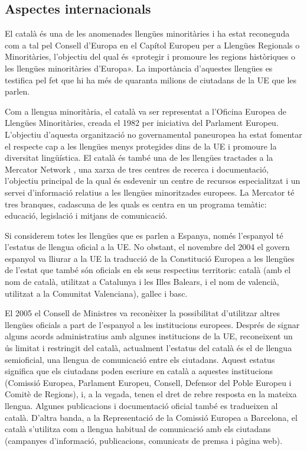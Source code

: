 \begin{multicols}{2}
\subsection{Aspectes internacionals}

El català és una de les anomenades llengües minoritàries i ha estat reconeguda com a tal pel Consell d’Europa en el Capítol Europeu per a Llengües Regionals o Minoritàries, l’objectiu del qual és «protegir i promoure les regions històriques o les llengües minoritàries d’Europa». La importància d’aquestes llengües es testifica pel fet que hi ha més de quaranta milions de ciutadans de la UE que les parlen.


Com a llengua minoritària, el català va ser representat a l’Oficina Europea de Llengües Minoritàries, creada el 1982 per iniciativa del Parlament Europeu. L’objectiu d’aquesta organització no governamental paneuropea ha estat fomentar el respecte cap a les llengües menys protegides dins de la UE i promoure la diversitat lingüística. El català és també una de les llengües tractades a la Mercator Network \cite{CAT-Nota8}, una xarxa de tres centres de recerca i documentació, l’objectiu principal de la qual és esdevenir un centre de recursos especialitzat i un servei d’informació relatius a les llengües minoritzades europees. La Mercator té tres branques, cadascuna de les quals es centra en un programa temàtic: educació, legislació i mitjans de comunicació.  

Si considerem totes les llengües que es parlen a Espanya, només l’espanyol té l’estatus de llengua oficial a la UE. No obstant, el novembre del 2004 el govern espanyol va lliurar a la UE la traducció de la Constitució Europea a les llengües de l’estat que també són oficials en els seus respectius territoris: català (amb el nom de català, utilitzat a Catalunya i les Illes Balears, i el nom de valencià, utilitzat a la Comunitat Valenciana), gallec i basc.

El 2005 el Consell de Ministres va reconèixer la possibilitat d’utilitzar altres llengües oficials a part de l’espanyol a les institucions europees. Després de signar alguns acords administratius amb algunes institucions de la UE, reconeixent un ús limitat i restringit del català, actualment l’estatus del català és el de llengua semioficial, una llengua de comunicació entre els ciutadans. Aquest estatus significa que els ciutadans poden escriure en català a aquestes institucions (Comissió Europea, Parlament Europeu, Consell, Defensor del Poble Europeu i Comitè de Regions), i, a la vegada, tenen el dret de rebre resposta en la mateixa llengua. Algunes publicacions i documentació oficial també es tradueixen al català. D’altra banda, a la Representació de la Comissió Europea a Barcelona, el català s’utilitza com a llengua habitual de comunicació amb els ciutadans (campanyes d’informació, publicacions, comunicats de premsa i pàgina web). 


\end{multicols}
